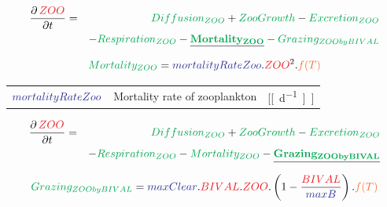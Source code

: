 \documentclass[final,xcolor=dvipsnames]{beamer}
\begin{document}
      \begin{frame}   
	\begin{exampleblock}{}
	  \begin{eqnarray*}
	    \small
	    \frac{\partial\,\varC[ZOO]}{\partial t} & = & \proC[Diffusion_{ZOO}] + \proC[ZooGrowth] - \proC[Excretion_{ZOO}] \\
	& & - \proC[Respiration_{ZOO}] - \underline{\mathbf{\proC[Mortality_{ZOO}]}} - \proC[Grazing_{ZOObyBIVAL}] 
	  \end{eqnarray*}
	\end{exampleblock}
	\begin{exampleblock}{}
	  \begin{equation*}
	    \proC[Mortality_{ZOO}] =  \parC[mortalityRateZoo] . \varC[ZOO]^2 .\worC[f(T)]
	  \end{equation*}
	  \begin{tabular}{ l l l }
	    $\parC[mortalityRateZoo]$ &   Mortality rate of zooplankton &  [\unit[d^{-1}]]
	  \end{tabular}
	    \end{exampleblock}
      \end{frame}
      
            \begin{frame}   
	\begin{exampleblock}{}
	  \begin{eqnarray*}
	    \small
	    \frac{\partial\,\varC[ZOO]}{\partial t} & = & \proC[Diffusion_{ZOO}] + \proC[ZooGrowth] - \proC[Excretion_{ZOO}] \\
	    & & - \proC[Respiration_{ZOO}] - \proC[Mortality_{ZOO}] - \underline{\mathbf{\proC[Grazing_{ZOObyBIVAL}]}} 
	  \end{eqnarray*}
	\end{exampleblock}
	\begin{exampleblock}{}
	  \begin{equation*}
	    \proC[Grazing_{ZOObyBIVAL}] =   \parC[maxClear] .\varC[BIVAL].\varC[ZOO]. \left( 1- \frac{\varC[BIVAL]}{\parC[maxB]}\right) .\worC[f(T)]
	  \end{equation*}
	    \end{exampleblock}
      \end{frame}
      
      
      
\end{document}
